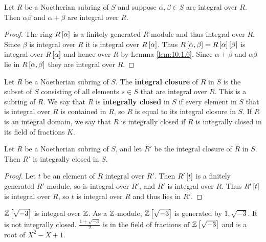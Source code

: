 \begin{corollary}
Let $ R $ be a Noetherian subring of $ S $ and suppose $ \alpha, \beta \in S $ are integral over $ R $. Then $ \alpha\beta $ and $ \alpha + \beta $ are integral over $ R $.
\end{corollary}

\begin{proof}
The ring $ R\sb{\alpha} $ is a finitely generated $ R $-module and thus integral over $ R $. Since $ \beta $ is integral over $ R $ it is integral over $ R\sb{\alpha} $. Thus $ R\sb{\alpha, \beta} = R\sb{\alpha}\sb{\beta} $ is integral over $ R\sb{\alpha} $ and hence over $ R $ by Lemma \ref{lem:10.1.6}. Since $ \alpha + \beta $ and $ \alpha\beta $ lie in $ R\sb{\alpha, \beta} $ they are integral over $ R $.
\end{proof}


\begin{definition}
Let $ R $ be a Noetherian subring of $ S $. The \textbf{integral closure} of $ R $ in $ S $ is the subset of $ S $ consisting of all elements $ s \in S $ that are integral over $ R $. This is a subring of $ R $. We say that $ R $ is \textbf{integrally closed} in $ S $ if every element in $ S $ that is integral over $ R $ is contained in $ R $, so $ R $ is equal to its integral closure in $ S $. If $ R $ is an integral domain, we say that $ R $ is integrally closed if $ R $ is integrally closed in its field of fractions $ K $.
\end{definition}

\begin{lemma}
Let $ R $ be a Noetherian subring of $ S $, and let $ R' $ be the integral closure of $ R $ in $ S $. Then $ R' $ is integrally closed in $ S $.
\end{lemma}

\begin{proof}
Let $ t $ be an element of $ R $ integral over $ R' $. Then $ R'\sb{t} $ is a finitely generated $ R' $-module, so is integral over $ R' $, and $ R' $ is integral over $ R $. Thus $ R'\sb{t} $ is integral over $ R $, so $ t $ is integral over $ R $ and thus lies in $ R' $.
\end{proof}

\begin{example2}
$ \Z\sb{\sqrt{-3}} $ is integral over $ \Z $. As a $ \Z $-module, $ \Z\sb{\sqrt{-3}} $ is generated by $ 1, \sqrt{-3} $. It is not integrally closed. $ \tfrac{1 + \sqrt{-3}}{2} $ is in the field of fractions of $ \Z\sb{\sqrt{-3}} $ and is a root of $ X^2 - X + 1 $.
\end{example2}

